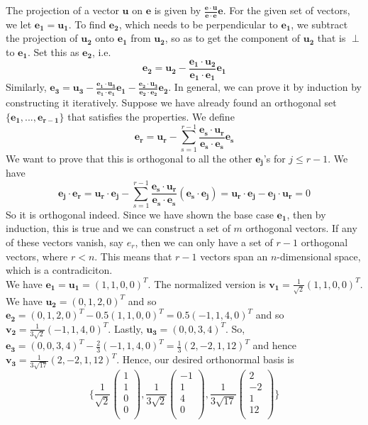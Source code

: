 \documentclass[a4paper]{article}
\begin{document}
\begin{ans}
The projection of a vector $\mathbf{u}$ on $\mathbf{e}$ is given by $\frac{\mathbf{e}\cdot\mathbf{u}}{\mathbf{e}\cdot\mathbf{e}}\mathbf{e}$. For the given set of vectors, we let $\mathbf{e_1}=\mathbf{u_1}$. To find $\mathbf{e_2}$, which needs to be perpendicular to $\mathbf{e_1}$, we subtract the projection of $\mathbf{u_2}$ onto $\mathbf{e_1}$ from $\mathbf{u_2}$, so as to get the component of $\mathbf{u_2}$ that is $\perp$ to $\mathbf{e_1}$. Set this as $\mathbf{e_2}$, i.e.
$$\mathbf{e_2}=\mathbf{u_2}-\frac{\mathbf{e_1}\cdot\mathbf{u_2}}{\mathbf{e_1}\cdot\mathbf{e_1}}\mathbf{e_1}$$
Similarly, $\mathbf{e_3}=\mathbf{u_3}-\frac{\mathbf{e_1}\cdot\mathbf{u_3}}{\mathbf{e_1}\cdot\mathbf{e_1}}\mathbf{e_1}-\frac{\mathbf{e_2}\cdot\mathbf{u_3}}{\mathbf{e_2}\cdot\mathbf{e_2}}\mathbf{e_2}$. In general, we can prove it by induction by constructing it iteratively. Suppose we have already found an orthogonal set $\{\mathbf{e_1},..., \mathbf{e_{r-1}}\}$ that satisfies the properties. We define 
$$\mathbf{e_r}=\mathbf{u_r}-\sum_{s=1}^{r-1}\frac{\mathbf{e_s}\cdot\mathbf{u_r}}{\mathbf{e_s}\cdot\mathbf{e_s}}\mathbf{e_s}$$
We want to prove that this is orthogonal to all the other $\mathbf{e_j}$’s for $j\leq r-1$. We have
$$\mathbf{e_j}\cdot\mathbf{e_r}=\mathbf{u_r}\cdot\mathbf{e_j}-\sum_{s=1}^{r-1}\frac{\mathbf{e_s}\cdot\mathbf{u_r}}{\mathbf{e_s}\cdot\mathbf{e_s}}(\mathbf{e_s}\cdot\mathbf{e_j})=\mathbf{u_r}\cdot\mathbf{e_j}-\mathbf{e_j}\cdot\mathbf{u_r}=0$$
So it is orthogonal indeed. Since we have shown the base case $\mathbf{e_1}$, then by induction, this is true and we can construct a set of $m$ orthogonal vectors. If any of these vectors vanish, say $e_r$, then we can only have a set of $r-1$ orthogonal vectors, where $r<n$. This means that $r-1$ vectors span an $n$-dimensional space, which is a contradiciton.\\[5pt]
We have $\mathbf{e_1}=\mathbf{u_1}=(1,1,0,0)^T$. The normalized version is $\mathbf{v_1}=\frac{1}{\sqrt{2}}(1,1,0,0)^T$. We have $\mathbf{u_2}=(0,1,2,0)^T$ and so $\mathbf{e_2}=(0,1,2,0)^T-0.5(1,1,0,0)^T=0.5(-1,1,4,0)^T$ and so $\mathbf{v_2}=\frac{1}{3\sqrt{2}}(-1,1,4,0)^T$. Lastly, $\mathbf{u_3}=(0,0,3,4)^T$. So, $\mathbf{e_3}=(0,0,3,4)^T-\frac{2}{3}(-1,1,4,0)^T=\frac{1}{3}(2,-2,1,12)^T$ and hence $\mathbf{v_3}=\frac{1}{3\sqrt{17}}(2,-2,1,12)^T$. Hence, our desired orthonormal basis is
$$\bigg\{\frac{1}{\sqrt{2}}\begin{pmatrix}1\\1\\0\\0\\\end{pmatrix},\frac{1}{3\sqrt{2}}\begin{pmatrix}-1\\1\\4\\0\\\end{pmatrix},\frac{1}{3\sqrt{17}}\begin{pmatrix}2\\-2\\1\\12\\\end{pmatrix}\bigg\}$$
\end{ans}
\end{document}
